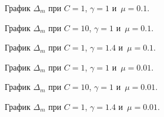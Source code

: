 \begin{figure}[H]
\caption{График $\Delta_{m}$ при $C = 1$, $\gamma = 1$ и~$\mu = 0.1$.}
\end{figure}

\begin{figure}[H]
\caption{График $\Delta_{m}$ при $C = 10$, $\gamma = 1$ и~$\mu = 0.1$.}
\end{figure}

\begin{figure}[H]
\caption{График $\Delta_{m}$ при $C = 1$, $\gamma = 1.4$ и~$\mu = 0.1$.}
\end{figure}

\begin{figure}[H]
\caption{График $\Delta_{m}$ при $C = 1$, $\gamma = 1$ и~$\mu = 0.01$.}
\end{figure}

\begin{figure}[H]
\caption{График $\Delta_{m}$ при $C = 10$, $\gamma = 1$ и~$\mu = 0.01$.}
\end{figure}

\begin{figure}[H]
\caption{График $\Delta_{m}$ при $C = 1$, $\gamma = 1.4$ и~$\mu = 0.01$.}
\end{figure}
